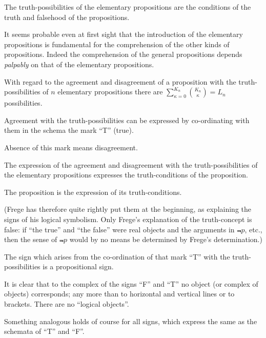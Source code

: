 {The truth-possibilities of the elementary propositions
are the conditions of the truth and
falsehood of the propositions.}


{It seems probable even at first sight that the
introduction of the elementary propositions is
fundamental for the comprehension of the other
kinds of propositions. Indeed the comprehension
of the general propositions depends \emph{palpably} on
that of the elementary propositions.}


{With regard to the agreement and disagreement
of a proposition with the truth-possibilities
of $n$ elementary propositions there
are $\sum\limits_{\kappa = 0}^{K_n}\binom{K_n}{\kappa} = L_{n}$ possibilities.}


{Agreement with the truth-possibilities can be
expressed by co-or\-di\-na\-ting with them in the
schema the mark ``T'' (true).

Absence of this mark means disagreement.}


{The expression of the agreement and disagreement
with the truth-pos\-si\-bil\-i\-ties of the elementary
propositions expresses the truth-conditions of the
proposition.

The proposition is the expression of its truth-conditions.

(Frege has therefore quite rightly put them at
the beginning, as explaining the signs of his
logical symbolism. Only Frege's explanation
of the truth-concept is false: if ``the true'' and
``the false'' were real objects and the arguments
in $\Not{p}$, etc., then the sense of $\Not{p}$ would by no
means be determined by Frege's determination.)}


{The sign which arises from the co-ordination of
that mark ``T'' with the truth-pos\-si\-bil\-i\-ties is a
propositional sign.}


{It is clear that to the complex of the signs ``F''
and ``T'' no object (or complex of objects) corresponds;
any more than to horizontal and vertical
lines or to brackets. There are no ``logical
objects''.

Something analogous holds of course for all
signs, which express the same as the schemata of
``T'' and ``F''.}


